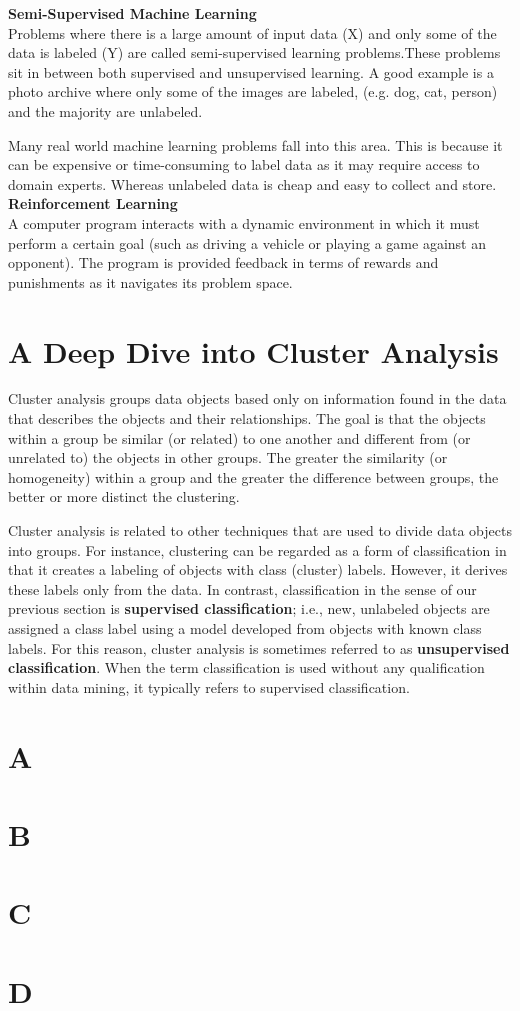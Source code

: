 \textbf{Semi-Supervised Machine Learning}\\
Problems where there is a large amount of input data (X) and only some of the data is labeled
(Y) are called semi-supervised learning problems.These problems sit in between both supervised
and unsupervised learning. A good example is a photo archive where only some of the
images are labeled, (e.g. dog, cat, person) and the majority are unlabeled.

Many real world machine learning problems fall into this area. This is because it can be
expensive or time-consuming to label data as it may require access to domain experts. Whereas
unlabeled data is cheap and easy to collect and store.\\

\textbf{Reinforcement Learning}\\
A computer program interacts with a dynamic environment in which it must perform a certain
goal (such as driving a vehicle or playing a game against an opponent). The program is provided
feedback in terms of rewards and punishments as it navigates its problem space.

\section{A Deep Dive into Cluster Analysis}
Cluster analysis groups data objects based only on information found in the
data that describes the objects and their relationships.  The goal is that the
objects within a group be similar (or related) to one another and different from
(or unrelated to) the objects in other groups.  The greater the similarity (or
homogeneity) within a group and the greater the difference between groups,
the better or more distinct the clustering.

Cluster analysis is related to other techniques that are used to divide data
objects into groups.  For instance, clustering can be regarded as a form of
classification in that it creates a labeling of objects with class (cluster) labels.
However, it derives these labels only from the data. In contrast, classification
in the sense of our previous section is \textbf{supervised classification}; i.e.,
new, unlabeled objects are assigned a class label using a model developed from objects with
known class labels. For this reason, cluster analysis is sometimes referred to as
\textbf{unsupervised classification}. When the term classification is used
without any qualification within data mining, it typically refers to supervised
classification.

\section{A}
\section{B}
\section{C}
\section{D}

\endinput
